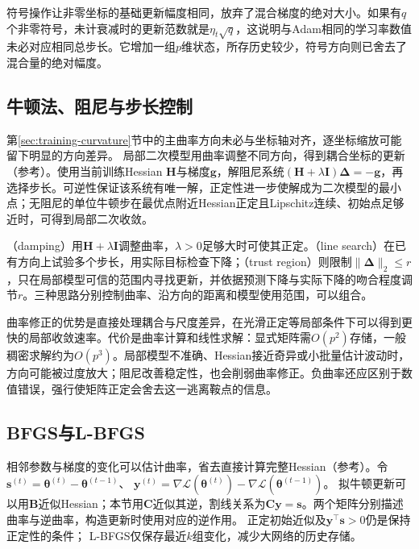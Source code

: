 符号操作让非零坐标的基础更新幅度相同，放弃了混合梯度的绝对大小。如果有$q$个非零符号，未计衰减时的更新范数就是$\eta_t\sqrt q$，这说明与Adam相同的学习率数值未必对应相同总步长。它增加一组$p$维状态，所存历史较少，符号方向则已舍去了混合量的绝对幅度。

\subsection{牛顿法、阻尼与步长控制}
\label{sec:training-second-order}

第\ref{sec:training-curvature}节中的主曲率方向未必与坐标轴对齐，逐坐标缩放可能留下明显的方向差异。
局部二次模型用曲率调整不同方向，得到耦合坐标的更新（参考）。使用当前训练Hessian $\bm H$与梯度$\bm g$，解阻尼系统$(\bm H+\lambda\bm I)\bm\Delta=-\bm g$，再选择步长。可逆性保证该系统有唯一解，正定性进一步使解成为二次模型的最小点；无阻尼的单位牛顿步在最优点附近Hessian正定且Lipschitz连续、初始点足够近时，可得到局部二次收敛。

（damping）用$\bm H+\lambda\bm I$调整曲率，$\lambda>0$足够大时可使其正定。（line search）在已有方向上试验多个步长，用实际目标检查下降；（trust region）则限制$\lVert\bm\Delta\rVert_2\leq r$，只在局部模型可信的范围内寻找更新，并依据预测下降与实际下降的吻合程度调节$r$。三种思路分别控制曲率、沿方向的距离和模型使用范围，可以组合。

曲率修正的优势是直接处理耦合与尺度差异，在光滑正定等局部条件下可以得到更快的局部收敛速率。代价是曲率计算和线性求解：显式矩阵需$O(p^2)$存储，一般稠密求解约为$O(p^3)$。局部模型不准确、Hessian接近奇异或小批量估计波动时，方向可能被过度放大；阻尼改善稳定性，也会削弱曲率修正。负曲率还应区别于数值错误，强行使矩阵正定会舍去这一逃离鞍点的信息。

\subsection{BFGS与L-BFGS}
\label{sec:training-quasi-newton}

相邻参数与梯度的变化可以估计曲率，省去直接计算完整Hessian（参考）。令$\bm s^{(t)}=\bm\theta^{(t)}-\bm\theta^{(t-1)}$、
$\bm y^{(t)}=\nabla\mathcal L(\bm\theta^{(t)})-\nabla\mathcal L(\bm\theta^{(t-1)})$。
拟牛顿更新可以用$\bm B$近似Hessian；本节用$\bm C$近似其逆，割线关系为$\bm C\bm y=\bm s$。两个矩阵分别描述曲率与逆曲率，构造更新时使用对应的逆作用。
正定初始近似及$\bm y^\top\bm s>0$仍是保持正定性的条件；
L-BFGS仅保存最近$k$组变化，减少大网络的历史存储。

